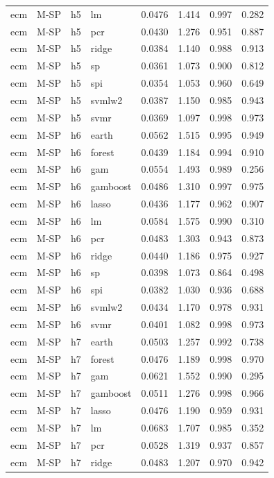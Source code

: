 \begin{ThreePartTable}
\begin{longtable}[t]{llclcccc}
ecm & M-SP & h5 & lm & 0.0476 & 1.414 & 0.997 & 0.282\\
ecm & M-SP & h5 & pcr & 0.0430 & 1.276 & 0.951 & 0.887\\
ecm & M-SP & h5 & ridge & 0.0384 & 1.140 & 0.988 & 0.913\\
ecm & M-SP & h5 & sp & 0.0361 & 1.073 & 0.900 & 0.812\\
ecm & M-SP & h5 & spi & 0.0354 & 1.053 & 0.960 & 0.649\\
ecm & M-SP & h5 & svmlw2 & 0.0387 & 1.150 & 0.985 & 0.943\\
ecm & M-SP & h5 & svmr & 0.0369 & 1.097 & 0.998 & 0.973\\
\addlinespace
ecm & M-SP & h6 & earth & 0.0562 & 1.515 & 0.995 & 0.949\\
ecm & M-SP & h6 & forest & 0.0439 & 1.184 & 0.994 & 0.910\\
ecm & M-SP & h6 & gam & 0.0554 & 1.493 & 0.989 & 0.256\\
ecm & M-SP & h6 & gamboost & 0.0486 & 1.310 & 0.997 & 0.975\\
ecm & M-SP & h6 & lasso & 0.0436 & 1.177 & 0.962 & 0.907\\
ecm & M-SP & h6 & lm & 0.0584 & 1.575 & 0.990 & 0.310\\
ecm & M-SP & h6 & pcr & 0.0483 & 1.303 & 0.943 & 0.873\\
ecm & M-SP & h6 & ridge & 0.0440 & 1.186 & 0.975 & 0.927\\
ecm & M-SP & h6 & sp & 0.0398 & 1.073 & 0.864 & 0.498\\
ecm & M-SP & h6 & spi & 0.0382 & 1.030 & 0.936 & 0.688\\
ecm & M-SP & h6 & svmlw2 & 0.0434 & 1.170 & 0.978 & 0.931\\
ecm & M-SP & h6 & svmr & 0.0401 & 1.082 & 0.998 & 0.973\\
\addlinespace
ecm & M-SP & h7 & earth & 0.0503 & 1.257 & 0.992 & 0.738\\
ecm & M-SP & h7 & forest & 0.0476 & 1.189 & 0.998 & 0.970\\
ecm & M-SP & h7 & gam & 0.0621 & 1.552 & 0.990 & 0.295\\
ecm & M-SP & h7 & gamboost & 0.0511 & 1.276 & 0.998 & 0.966\\
ecm & M-SP & h7 & lasso & 0.0476 & 1.190 & 0.959 & 0.931\\
ecm & M-SP & h7 & lm & 0.0683 & 1.707 & 0.985 & 0.352\\
ecm & M-SP & h7 & pcr & 0.0528 & 1.319 & 0.937 & 0.857\\
ecm & M-SP & h7 & ridge & 0.0483 & 1.207 & 0.970 & 0.942\\

\end{longtable}
\end{ThreePartTable}
